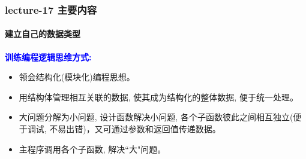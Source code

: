 \begin{frame}[shrink]
\frametitle{lecture-17 主要内容}
\framesubtitle{建立自己的数据类型}
\tableofcontents
\medskip
\textbf{\textcolor{blue}{训练编程逻辑思维方式:}}
\begin{itemize}
	\item 领会结构化(模块化)编程思想。 
	\item 用结构体管理相互关联的数据, 使其成为结构化的整体数据, 便于统一处理。 
	\item 大问题分解为小问题, 设计函数解决小问题, 各个子函数彼此之间相互独立(便于调试, 不易出错)，又可通过参数和返回值传递数据。
	\item 主程序调用各个子函数, 解决``大"问题。
\end{itemize}
\end{frame}


